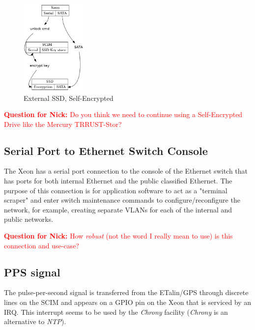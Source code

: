 \documentclass[12pt]{article}
\begin{document}
\begin{figure}[H]
\begin{center}
\includegraphics[width=0.3\textwidth]{img/ssd}
\caption{External SSD, Self-Encrypted}
\label{fig:ssd}
\end{center}
\end{figure}

\textcolor{red}{\textbf{Question for Nick:} Do you think we need to
continue using a Self-Encrypted Drive like the Mercury TRRUST-Stor?}



\subsection{Serial Port to Ethernet Switch Console}
\label{section:switch_console}

The Xeon has a serial port connection to the console of the Ethernet switch that has ports for both internal Ethernet and the public classified Ethernet.
The purpose of this connection is for application software to act as a "terminal scraper" and enter switch maintenance commands to configure/reconfigure the network, for example, creating separate VLANs for each of the internal and public networks.

\textcolor{red}{\textbf{Question for Nick:} How \textit{robust} (not the word I really mean to use) is this connection and use-case?}



\subsection{PPS signal}
\label{section:pps}

The pulse-per-second signal is transferred from the ETalin/GPS through discrete lines on the SCIM and appears on a GPIO pin on the Xeon that is serviced by an IRQ.
This interrupt seems to be used by the \textit{Chrony} facility (\textit{Chrony} is an alternative to \textit{NTP}).
\end{document}
